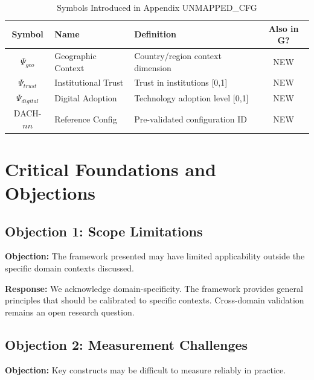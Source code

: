 \vspace{0.5em}

\begin{table}[htbp]
\centering
\caption{Symbols Introduced in Appendix UNMAPPED_CFG}
\label{tab:ggg-symbols}
\renewcommand{\arraystretch}{1.3}
\begin{tabular}{@{}clp{6cm}c@{}}
\toprule
\textbf{Symbol} & \textbf{Name} & \textbf{Definition} & \textbf{Also in G?} \\
\midrule
$\Psi_{geo}$ & Geographic Context & Country/region context dimension & NEW \\
$\Psi_{trust}$ & Institutional Trust & Trust in institutions [0,1] & NEW \\
$\Psi_{digital}$ & Digital Adoption & Technology adoption level [0,1] & NEW \\
DACH-$nn$ & Reference Config & Pre-validated configuration ID & NEW \\
\bottomrule
\end{tabular}
\end{table}



\section{Critical Foundations and Objections}
\label{sec:cfg-foundations}

\subsection{Objection 1: Scope Limitations}

\textbf{Objection:} The framework presented may have limited applicability
outside the specific domain contexts discussed.

\textbf{Response:} We acknowledge domain-specificity. The framework provides
general principles that should be calibrated to specific contexts. Cross-domain
validation remains an open research question.

\subsection{Objection 2: Measurement Challenges}

\textbf{Objection:} Key constructs may be difficult to measure reliably in
practice.

